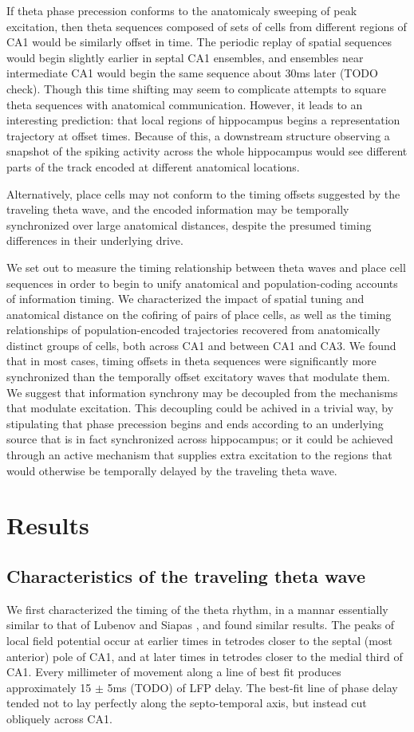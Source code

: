 \documentclass[10pt]{article}
\begin{document}
If theta phase precession conforms to the anatomicaly sweeping of peak excitation, then theta sequences composed of sets of cells from different regions of CA1 would be similarly offset in time. The periodic replay of spatial sequences would begin slightly earlier in septal CA1 ensembles, and ensembles near intermediate CA1 would begin the same sequence about 30ms later (TODO check). Though this time shifting may seem to complicate attempts to square theta sequences with anatomical communication. However, it leads to an interesting prediction: that local regions of hippocampus begins a representation trajectory at offset times. Because of this, a downstream structure observing a snapshot of the spiking activity across the whole hippocampus would see different parts of the track encoded at different anatomical locations.

Alternatively, place cells may not conform to the timing offsets suggested by the traveling theta wave, and the encoded information may be temporally synchronized over large anatomical distances, despite the presumed timing differences in their underlying drive.

We set out to measure the timing relationship between theta waves and place cell sequences in order to begin to unify anatomical and population-coding accounts of information timing. We characterized the impact of spatial tuning and anatomical distance on the cofiring of pairs of place cells, as well as the timing relationships of population-encoded trajectories recovered from anatomically distinct groups of cells, both across CA1 and between CA1 and CA3. We found that in most cases, timing offsets in theta sequences were significantly more synchronized than the temporally offset excitatory waves that modulate them. We suggest that information synchrony may be decoupled from the mechanisms that modulate excitation. This decoupling could be achived in a trivial way, by stipulating that phase precession begins and ends according to an underlying source that is in fact synchronized across hippocampus; or it could be achieved through an active mechanism that supplies extra excitation to the regions that would otherwise be temporally delayed by the traveling theta wave.

\section*{Results}

\subsection*{Characteristics of the traveling theta wave}
We first characterized the timing of the theta rhythm, in a mannar essentially similar to that of Lubenov and Siapas \cite{TODO}, and found similar results. The peaks of local field potential occur at earlier times in tetrodes closer to the septal (most anterior) pole of CA1, and at later times in tetrodes closer to the medial third of CA1. Every millimeter of movement along a line of best fit produces approximately 15 $\pm$ 5ms (TODO) of LFP delay. The best-fit line of phase delay tended not to lay perfectly along the septo-temporal axis, but instead cut obliquely across CA1. 
\end{document}
